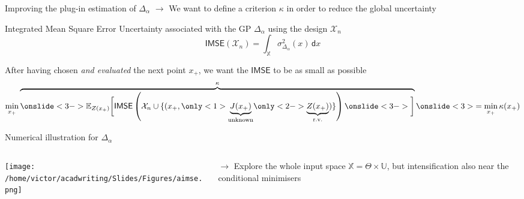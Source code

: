 \documentclass[10pt,aspectratio=169,usepdftitle=false]{beamer}
\newcommand{\Uspace}{\mathbb{U}}
\newcommand{\Kspace}{\Theta}
\newcommand{\Xspace}{\mathbb{X}}
\newcommand{\Ex}{\mathbb{E}}
\begin{document}
\begin{frame}{Improving the plug-in estimation of $\Delta_{\alpha}$}
  $\rightarrow$ We want to define a criterion $\kappa$ in order to
  reduce the \alert{global} uncertainty
  \begin{block}{Integrated Mean Square Error}
    Uncertainty associated with the GP $\Delta_{\alpha}$ using the design $\mathcal{X}_n$
    \begin{equation}
    \mathsf{IMSE}(\mathcal{X}_n) = \int_{\Xspace}  \sigma^2_{\Delta_{\alpha}}(x)\,\mathsf{d}x
  \end{equation}
  \end{block}
  
  After having chosen \emph{and evaluated} the next point $x_{+}$, we want the $\mathsf{IMSE}$ to be as small as possible
  \begin{equation}
    \min_{x_{+}} \overbrace{\onslide<3->{\Ex_{Z(x_+)}\bigg[}\mathsf{IMSE}\left(\mathcal{X}_n \cup \{(x_{+}, \only<1>{\underbrace{J(x_{+})}_{\text{unknown}}} \only<2->{\underbrace{Z(x_+)}_{\text{r.v.}}})\}\right) \onslide<3->{\bigg]}}^{\kappa} \onslide<3>{= \min_{x_+} \kappa(x_{+})}
  \end{equation}
\end{frame}
\begin{frame}{Numerical illustration for $\Delta_{\alpha}$}
  \begin{columns}
    \begin{column}{0.5\textwidth}
  \begin{center}
  \texttt{[image: /home/victor/acadwriting/Slides/Figures/aimse.png]}
\end{center}
\end{column}
\begin{column}{0.5\textwidth}
  $\rightarrow$ Explore the whole input space
  $\Xspace=\Kspace \times \Uspace$, but intensification also near the
  conditional minimisers
\end{column}
\end{columns}
\end{frame}
\end{document}

